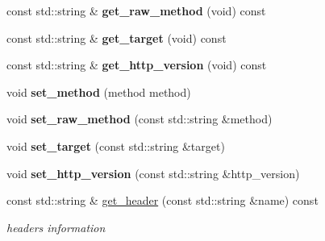 \begin{DoxyCompactItemize}
\mbox{\label{classnetflex_1_1http_1_1request_a708887a8c3a3582dbec9e1e5e2ec7b0b}} 
const std\+::string \& {\bfseries get\+\_\+raw\+\_\+method} (void) const
\item 
\mbox{\label{classnetflex_1_1http_1_1request_aed90cb36a29b9bd2b0346ba0f399615a}} 
const std\+::string \& {\bfseries get\+\_\+target} (void) const
\item 
\mbox{\label{classnetflex_1_1http_1_1request_ab0cabbb537eb7470d06f4c8039d0e7cb}} 
const std\+::string \& {\bfseries get\+\_\+http\+\_\+version} (void) const
\item 
\mbox{\label{classnetflex_1_1http_1_1request_a7210ff25735da523403171152ff653d4}} 
void {\bfseries set\+\_\+method} (method method)
\item 
\mbox{\label{classnetflex_1_1http_1_1request_ad7e544191ac0fc2b97460265bccb4353}} 
void {\bfseries set\+\_\+raw\+\_\+method} (const std\+::string \&method)
\item 
\mbox{\label{classnetflex_1_1http_1_1request_ab8d678abf27538c7b3d7aade35496b06}} 
void {\bfseries set\+\_\+target} (const std\+::string \&target)
\item 
\mbox{\label{classnetflex_1_1http_1_1request_ab2c0c3caea31016028defd3b76035bd3}} 
void {\bfseries set\+\_\+http\+\_\+version} (const std\+::string \&http\+\_\+version)
\item 
\mbox{\label{classnetflex_1_1http_1_1request_a5d94ca7f1b6ce44a27c655570f2b8899}} 
const std\+::string \& \hyperlink{classnetflex_1_1http_1_1request_a5d94ca7f1b6ce44a27c655570f2b8899}{get\+\_\+header} (const std\+::string \&name) const
\begin{DoxyCompactList}\small\item\em headers information \end{DoxyCompactList}\item 
\mbox{\label{classnetflex_1_1http_1_1request_a20a9b71acd61945261bbeaf81a73caf8}} 

\end{DoxyCompactItemize}
